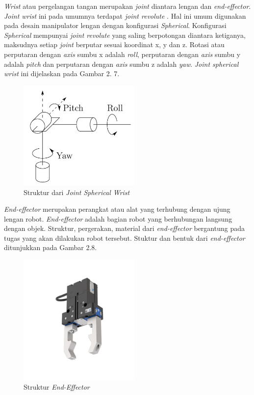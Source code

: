 \textit{Wrist} atau pergelangan tangan merupakan \textit{joint} diantara lengan dan \textit{end-effector}. \textit{Joint wrist} ini pada umumnya terdapat \textit{joint revolute} . Hal ini umum digunakan pada desain manipulator lengan dengan konfigurasi \textit{Spherical}. Konfigurasi \textit{Spherical} mempunyai \textit{joint revolute} yang saling berpotongan diantara ketiganya, maksudnya setiap \textit{joint} berputar sesuai koordinat x, y dan z. Rotasi atau perputaran dengan \textit{axis} sumbu x adalah \textit{roll}, perputaran dengan \textit{axis} sumbu y adalah \textit{pitch} dan perputaran dengan \textit{axis} sumbu z adalah \textit{yaw}. \textit{Joint spherical wrist} ini dijelaskan pada Gambar 2. 7.
	\begin{figure}[H]
	\centering
	\includegraphics[width=6cm]{gambar/wirst.jpg}
	\caption{Struktur dari \textit{Joint Spherical Wrist}}
\end{figure}


\textit{End-effector} merupakan perangkat atau alat yang terhubung dengan ujung lengan robot. \textit{End-effector} adalah bagian robot yang berhubungan langsung dengan objek. Struktur, pergerakan, material dari \textit{end-effector} bergantung pada tugas yang akan dilakukan robot tersebut. Stuktur dan bentuk dari \textit{end-effector} ditunjukkan pada Gambar 2.8.
	\begin{figure}[H]
	\centering
	\includegraphics[width=6cm]{gambar/end_effector.jpg}
	\caption{Struktur \textit{End-Effector}}
	\end{figure}


